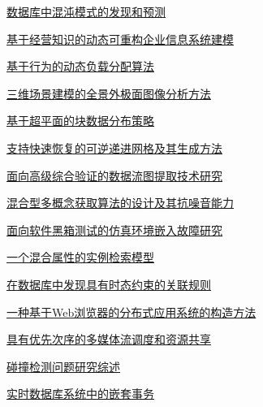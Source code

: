 \documentclass[a4paper]{article}
\begin{document}
\href{http://www.jos.org.cn/ch/reader/download_pdf.aspx?file_no=19990504&year_id=1999&quarter_id=5&falg=1}{数据库中混沌模式的发现和预测}

\href{http://www.jos.org.cn/ch/reader/download_pdf.aspx?file_no=19990505&year_id=1999&quarter_id=5&falg=1}{基于经营知识的动态可重构企业信息系统建模}

\href{http://www.jos.org.cn/ch/reader/download_pdf.aspx?file_no=19990506&year_id=1999&quarter_id=5&falg=1}{基于行为的动态负载分配算法}

\href{http://www.jos.org.cn/ch/reader/download_pdf.aspx?file_no=19990507&year_id=1999&quarter_id=5&falg=1}{三维场景建模的全景外极面图像分析方法}

\href{http://www.jos.org.cn/ch/reader/download_pdf.aspx?file_no=19990508&year_id=1999&quarter_id=5&falg=1}{基于超平面的块数据分布策略}

\href{http://www.jos.org.cn/ch/reader/download_pdf.aspx?file_no=19990509&year_id=1999&quarter_id=5&falg=1}{支持快速恢复的可逆递进网格及其生成方法}

\href{http://www.jos.org.cn/ch/reader/download_pdf.aspx?file_no=19990510&year_id=1999&quarter_id=5&falg=1}{面向高级综合验证的数据流图提取技术研究}

\href{http://www.jos.org.cn/ch/reader/download_pdf.aspx?file_no=19990511&year_id=1999&quarter_id=5&falg=1}{混合型多概念获取算法的设计及其抗噪音能力}

\href{http://www.jos.org.cn/ch/reader/download_pdf.aspx?file_no=19990512&year_id=1999&quarter_id=5&falg=1}{面向软件黑箱测试的仿真环境嵌入故障研究}

\href{http://www.jos.org.cn/ch/reader/download_pdf.aspx?file_no=19990513&year_id=1999&quarter_id=5&falg=1}{一个混合属性的实例检索模型}

\href{http://www.jos.org.cn/ch/reader/download_pdf.aspx?file_no=19990514&year_id=1999&quarter_id=5&falg=1}{在数据库中发现具有时态约束的关联规则}

\href{http://www.jos.org.cn/ch/reader/download_pdf.aspx?file_no=19990515&year_id=1999&quarter_id=5&falg=1}{一种基于Web浏览器的分布式应用系统的构造方法}

\href{http://www.jos.org.cn/ch/reader/download_pdf.aspx?file_no=19990516&year_id=1999&quarter_id=5&falg=1}{具有优先次序的多媒体流调度和资源共享}

\href{http://www.jos.org.cn/ch/reader/download_pdf.aspx?file_no=19990517&year_id=1999&quarter_id=5&falg=1}{碰撞检测问题研究综述}

\href{http://www.jos.org.cn/ch/reader/download_pdf.aspx?file_no=19990518&year_id=1999&quarter_id=5&falg=1}{实时数据库系统中的嵌套事务}
\end{document}

